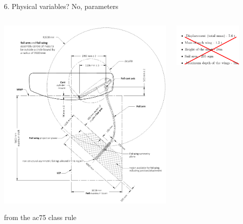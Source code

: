\documentclass[presentation,aspectratio=169]{beamer}
\begin{document}
\begin{frame}[label={sec:org829164f}]{6. Physical variables? No, parameters}
\begin{columns}
\begin{column}{0.5\columnwidth}
\begin{center}
\includegraphics[height=0.8\textheight]{../../figures/ac75-class-foil.png}
\end{center}

{\footnotesize from the ac75 class rule}
\end{column}
\begin{column}{0.5\columnwidth}
\begin{center}
\includegraphics[width=0.8\textwidth]{../../figures/parameters-not-variables}
\end{center}
\end{column}
\end{columns}
\end{frame}
\end{document}
